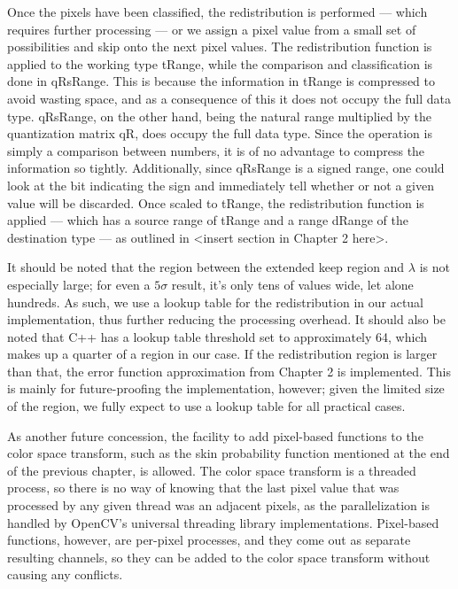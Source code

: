 Once the pixels have been classified, the redistribution is performed --- which requires further processing --- or we assign a pixel value from a small set of possibilities and skip onto the next pixel values. The redistribution function is applied to the working type tRange, while the comparison and classification is done in qRsRange. This is because the information in tRange is compressed to avoid wasting space, and as a consequence of this it does not occupy the full data type. qRsRange, on the other hand, being the natural range multiplied by the quantization matrix qR, does occupy the full data type. Since the operation is simply a comparison between numbers, it is of no advantage to compress the information so tightly. Additionally, since qRsRange is a signed range, one could look at the bit indicating the sign and immediately tell whether or not a given value will be discarded. Once scaled to tRange, the redistribution function is applied --- which has a source range of tRange and a range dRange of the destination type --- as outlined in <insert section in Chapter 2 here>.

It should be noted that the region between the extended keep region and $\lambda$ is not especially large; for even a $5\sigma$ result, it's only tens of values wide, let alone hundreds. As such, we use a lookup table for the redistribution in our actual implementation, thus further reducing the processing overhead. It should also be noted that C++ has a lookup table threshold set to approximately 64, which makes up a quarter of a region in our case. If the redistribution region is larger than that, the error function approximation from Chapter 2 is implemented. This is mainly for future-proofing the implementation, however; given the limited size of the region, we fully expect to use a lookup table for all practical cases.

As another future concession, the facility to add pixel-based functions to the color space transform, such as the skin probability function mentioned at the end of the previous chapter, is allowed. The color space transform is a threaded process, so there is no way of knowing that the last pixel value that was processed by any given thread was an adjacent pixels, as the parallelization is handled by OpenCV's universal threading library implementations. Pixel-based functions, however, are per-pixel processes, and they come out as separate resulting channels, so they can be added to the color space transform without causing any conflicts.




